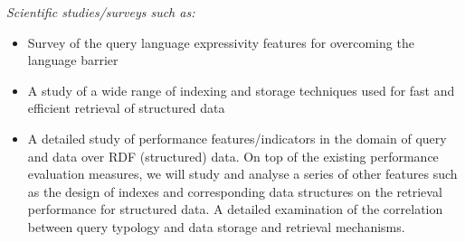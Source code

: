 \documentclass{llncs}
\begin{document}
    \textit{ Scientific studies/surveys such as:} 
        \begin{itemize}
            \item Survey of the query language expressivity features for overcoming the language barrier
            \item A study of a wide range of indexing and storage techniques used for fast and efficient retrieval of structured data
            \item A detailed study of performance features/indicators in the domain of query and data over RDF (structured) data. On top of the existing performance evaluation measures, we will study and analyse a series of other features such as the design of indexes and corresponding data structures on the retrieval performance for structured data. A detailed examination of the correlation between query typology and data storage and retrieval mechanisms.
        \end{itemize}
        
\end{document}
